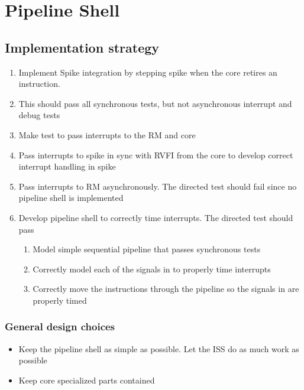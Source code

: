 \chapter{Pipeline Shell}




\section{Implementation strategy}

\begin{enumerate}
    \item Implement Spike integration by stepping spike when the core retires an instruction.
    \item This should pass all synchronous tests, but not asynchronous interrupt and debug tests
    \item Make test to pass interrupts to the RM and core
    \item Pass interrupts to spike in sync with RVFI from the core to develop correct interrupt handling in spike
    \item Pass interrupts to RM asynchronously. The directed test should fail since no pipeline shell is implemented
    \item Develop pipeline shell to correctly time interrupts. The directed test should pass
    \begin{enumerate}
        \item Model simple sequential pipeline that passes synchronous tests
        \item Correctly model each of the signals in  to properly time interrupts
        \item Correctly move the instructions through the pipeline so the signals in  are properly timed
    \end{enumerate}
\end{enumerate}

\subsection{General design choices}

\begin{itemize}
    \item Keep the pipeline shell as simple as possible. Let the ISS do as much work as possible
    \item Keep core specialized parts contained
\end{itemize}


